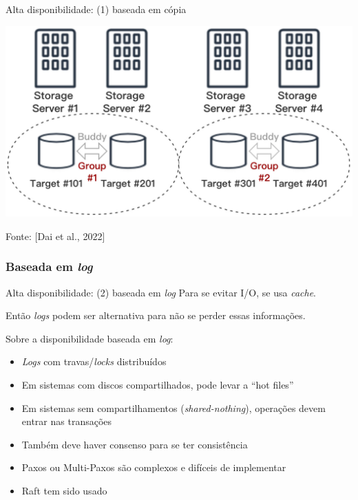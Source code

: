 \documentclass[xcolor=dvipsnames,table]{beamer}
\begin{document}
\begin{frame}{Alta disponibilidade: (1) baseada em cópia}
	\begin{center}
		\includegraphics[scale=0.3]{ha-copia.png}
	\end{center}
	Fonte: [Dai et al., 2022]
\end{frame}

\subsubsection{Baseada em \textit{log}}
\begin{frame}{Alta disponibilidade: (2) baseada em \textit{log}}
	Para se evitar I/O, se usa \textit{cache}.
	
	Então \textit{logs} podem ser alternativa para não se perder essas informações.
	
	Sobre a disponibilidade baseada em \textit{log}:
	\begin{itemize}
		\item \textit{Logs} com travas/\textit{locks} distribuídos
		\item Em sistemas com discos compartilhados, pode levar a ``hot files''
		\item Em sistemas sem compartilhamentos (\textit{shared-nothing}), operações devem entrar nas transações
		\item Também deve haver consenso para se ter consistência
		\item Paxos ou Multi-Paxos são complexos e difíceis de implementar
		\item Raft tem sido usado
	\end{itemize}
\end{frame}

\end{document}
